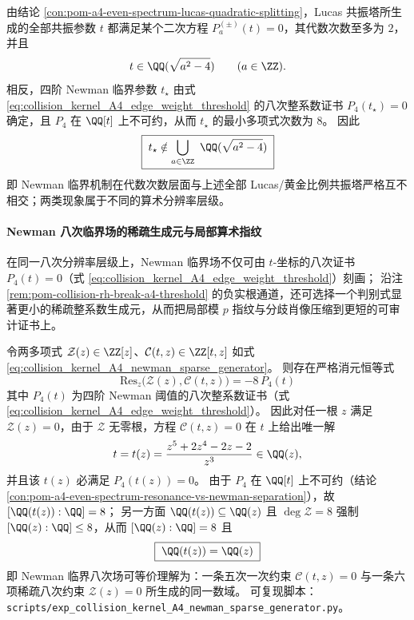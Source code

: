 \begin{conclusion}\label{con:pom-a4-even-spectrum-resonance-vs-newman-separation}
由结论 \ref{con:pom-a4-even-spectrum-lucas-quadratic-splitting}，Lucas 共振塔所生成的全部共振参数 \(t\) 都满足某个二次方程 \(P_a^{(\pm)}(t)=0\)，其代数次数至多为 \(2\)，并且
\[
t\in\QQ(\sqrt{a^2-4})
\qquad(a\in\ZZ).
\]
相反，四阶 Newman 临界参数 \(t_\star\) 由式 \eqref{eq:collision_kernel_A4_edge_weight_threshold} 的八次整系数证书 \(P_4(t_\star)=0\) 确定，且 \(P_4\) 在 \(\QQ[t]\) 上不可约，从而 \(t_\star\) 的最小多项式次数为 \(8\)。
因此
\[
\boxed{\;
t_\star\notin \bigcup_{a\in\ZZ}\ \QQ(\sqrt{a^2-4})\;}
\]
即 Newman 临界机制在代数次数层面与上述全部 Lucas/黄金比例共振塔严格互不相交；两类现象属于不同的算术分辨率层级。
\end{conclusion}

%
\paragraph{Newman 八次临界场的稀疏生成元与局部算术指纹}
在同一八次分辨率层级上，Newman 临界场不仅可由 \(t\)-坐标的八次证书 \(P_4(t)=0\)（式 \eqref{eq:collision_kernel_A4_edge_weight_threshold}）刻画；
沿注 \ref{rem:pom-collision-rh-break-a4-threshold} 的负实根通道，还可选择一个判别式显著更小的稀疏整系数生成元，从而把局部模 \(p\) 指纹与分歧肖像压缩到更短的可审计证书上。

\begin{conclusion}\label{con:pom-a4-newman-sparse-generator-elimination}
令两多项式 \(\mathcal Z(z)\in\ZZ[z]\)、\(\mathcal C(t,z)\in\ZZ[t,z]\) 如式 \eqref{eq:collision_kernel_A4_newman_sparse_generator}。
则存在严格消元恒等式
\[
\boxed{\;
\mathrm{Res}_z\!\bigl(\mathcal Z(z),\mathcal C(t,z)\bigr)=-8\,P_4(t)\;}
\]
其中 \(P_4(t)\) 为四阶 Newman 阈值的八次整系数证书（式 \eqref{eq:collision_kernel_A4_edge_weight_threshold}）。
因此对任一根 \(z\) 满足 \(\mathcal Z(z)=0\)，由于 \(\mathcal Z\) 无零根，方程 \(\mathcal C(t,z)=0\) 在 \(t\) 上给出唯一解
\[
t=t(z)=\frac{z^5+2z^4-2z-2}{z^3}\in\QQ(z),
\]
并且该 \(t(z)\) 必满足 \(P_4(t(z))=0\)。
由于 \(P_4\) 在 \(\QQ[t]\) 上不可约（结论 \ref{con:pom-a4-even-spectrum-resonance-vs-newman-separation}），故 \([\QQ(t(z)):\QQ]=8\)；
另一方面 \(\QQ(t(z))\subseteq \QQ(z)\) 且 \(\deg\mathcal Z=8\) 强制 \([\QQ(z):\QQ]\le 8\)，从而 \([\QQ(z):\QQ]=8\) 且
\[
\boxed{\;\QQ(t(z))=\QQ(z)\;}
\]
即 Newman 临界八次场可等价理解为：一条五次一次约束 \(\mathcal C(t,z)=0\) 与一条六项稀疏八次约束 \(\mathcal Z(z)=0\) 所生成的同一数域。
可复现脚本：\texttt{scripts/exp\_collision\_kernel\_A4\_newman\_sparse\_generator.py}。
\end{conclusion}

